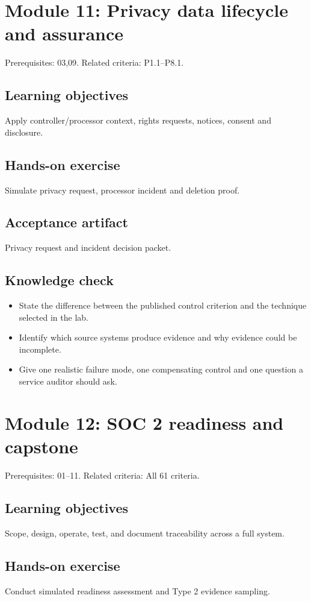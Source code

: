 \documentclass[10pt,oneside]{report}
\begin{document}
\section{Module 11: Privacy data lifecycle and assurance}
Prerequisites: 03,09. Related criteria: P1.1--P8.1.

\subsection{Learning objectives}
Apply controller/processor context, rights requests, notices, consent and disclosure.

\subsection{Hands-on exercise}
Simulate privacy request, processor incident and deletion proof.

\subsection{Acceptance artifact}
Privacy request and incident decision packet.

\subsection{Knowledge check}
\begin{itemize}
\item State the difference between the published control criterion and the technique selected in the lab.
\item Identify which source systems produce evidence and why evidence could be incomplete.
\item Give one realistic failure mode, one compensating control and one question a service auditor should ask.
\end{itemize}

\section{Module 12: SOC 2 readiness and capstone}
Prerequisites: 01--11. Related criteria: All 61 criteria.

\subsection{Learning objectives}
Scope, design, operate, test, and document traceability across a full system.

\subsection{Hands-on exercise}
Conduct simulated readiness assessment and Type 2 evidence sampling.
\end{document}

